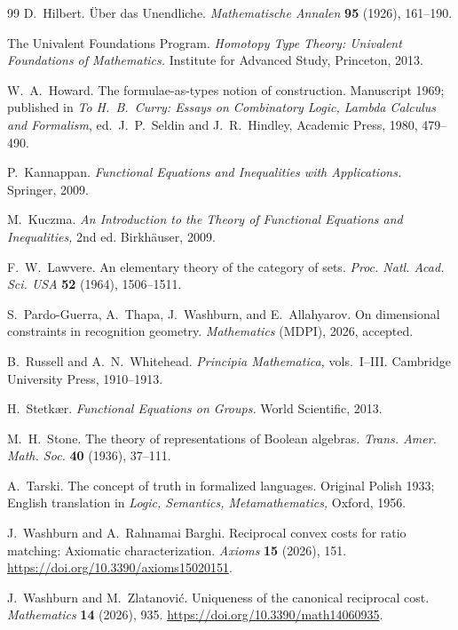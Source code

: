 \documentclass[11pt,a4paper]{article}
\theoremstyle{definition}
\theoremstyle{remark}
\begin{document}
\begin{thebibliography}{99}
D.~Hilbert.
\"Uber das Unendliche.
\textit{Mathematische Annalen} \textbf{95} (1926), 161--190.

The Univalent Foundations Program.
\textit{Homotopy Type Theory: Univalent Foundations of Mathematics.}
Institute for Advanced Study, Princeton, 2013.

W.~A.~Howard.
The formulae-as-types notion of construction.
Manuscript 1969; published in
\textit{To H.~B.~Curry: Essays on Combinatory Logic, Lambda Calculus and
Formalism},
ed.~J.~P.~Seldin and J.~R.~Hindley, Academic Press, 1980, 479--490.

P.~Kannappan.
\textit{Functional Equations and Inequalities with Applications.}
Springer, 2009.

M.~Kuczma.
\textit{An Introduction to the Theory of Functional Equations and
Inequalities,} 2nd ed.
Birkh\"auser, 2009.

F.~W.~Lawvere.
An elementary theory of the category of sets.
\textit{Proc. Natl. Acad. Sci. USA} \textbf{52} (1964), 1506--1511.

S.~Pardo-Guerra, A.~Thapa, J.~Washburn, and E.~Allahyarov.
On dimensional constraints in recognition geometry.
\textit{Mathematics} (MDPI), 2026, accepted.

B.~Russell and A.~N.~Whitehead.
\textit{Principia Mathematica,} vols.~I--III.
Cambridge University Press, 1910--1913.

H.~Stetk{\ae}r.
\textit{Functional Equations on Groups.}
World Scientific, 2013.

M.~H.~Stone.
The theory of representations of Boolean algebras.
\textit{Trans. Amer. Math. Soc.} \textbf{40} (1936), 37--111.

A.~Tarski.
The concept of truth in formalized languages.
Original Polish 1933; English translation in
\textit{Logic, Semantics, Metamathematics,} Oxford, 1956.

J.~Washburn and A.~Rahnamai Barghi.
Reciprocal convex costs for ratio matching: Axiomatic characterization.
\textit{Axioms} \textbf{15} (2026), 151.
\url{https://doi.org/10.3390/axioms15020151}.

J.~Washburn and M.~Zlatanovi\'c.
Uniqueness of the canonical reciprocal cost.
\textit{Mathematics} \textbf{14} (2026), 935.
\url{https://doi.org/10.3390/math14060935}.


\end{thebibliography}
\end{document}
